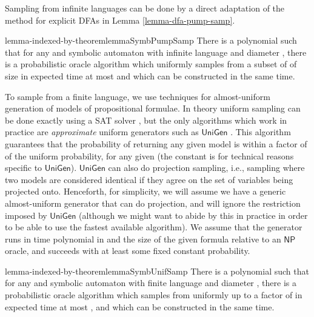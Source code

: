 \documentclass[a4paper,USenglish,numberwithinsect]{lipics}
\theoremstyle{plain}
\theoremstyle{definition}
\newcommand{\NP}{\ensuremath{\mathsf{NP}}}
\newcommand{\UniGen}{\ensuremath{\mathsf{UniGen}}}
\begin{document}
Sampling from infinite languages can be done by a direct adaptation of the method for explicit DFAs in Lemma \ref{lemma-dfa-pump-samp}.
\begin{restatable}{lemma-indexed-by-theorem}{lemmaSymbPumpSamp} \label{lemma:symb-pump-samp}
There is a polynomial  such that for any  and symbolic automaton  with infinite language and diameter , there is a probabilistic oracle algorithm  which uniformly samples from a subset of  of size  in expected time at most  and which can be constructed in the same time.
\end{restatable}

To sample from a finite language, we use techniques for almost-uniform
generation of models of propositional formulae. In theory uniform
sampling can be done exactly using a SAT solver \cite{bgp}, but the
only algorithms which work in practice are \emph{approximate} uniform
generators such as {\UniGen} \cite{unigen}. This algorithm guarantees
that the probability of returning any given model is within a factor
of  of the uniform probability, for any given 
(the constant is for technical reasons specific to
{\UniGen}). {\UniGen} can also do projection sampling, i.e., sampling
where two models are considered identical if they agree on the set of
variables being projected onto. Henceforth, for simplicity, we will
assume we have a generic almost-uniform generator that can do
projection, and will ignore the  restriction imposed by
{\UniGen} (although we might want to abide by this in practice in
order to be able to use the fastest available algorithm). We assume
that the generator runs in time polynomial in  and the size of
the given formula relative to an {\NP} oracle, and succeeds with at
least some fixed constant probability. 
\begin{restatable}{lemma-indexed-by-theorem}{lemmaSymbUnifSamp} \label{lemma:symb-unif-samp}
There is a polynomial  such that for any  and symbolic automaton  with finite language and diameter , there is a probabilistic oracle algorithm  which samples from  uniformly up to a factor of  in expected time at most , and which can be constructed in the same time.
\end{restatable}
\end{document}
